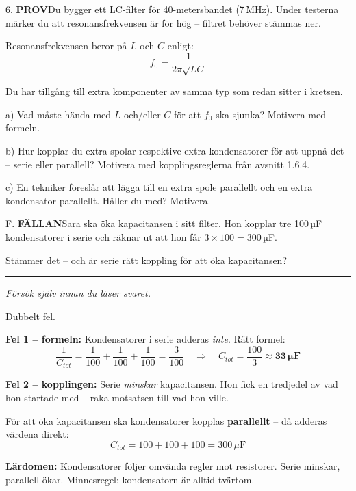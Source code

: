 \documentclass[a4paper,11pt,twoside]{book}
\newcommand{\qprov}{\colorbox{redpale}{\textcolor{reddark}{\headingfont\bfseries\tiny PROV}}}
\newcommand{\qfallan}{\colorbox{ljusbrun}{\textcolor{kakao}{\headingfont\bfseries\tiny FÄLLAN}}}
\begin{document}
\begin{qblock}{6.}
\qprov\quad Du bygger ett LC-filter för 40-metersbandet 
(7\,MHz). Under testerna märker du att resonansfrekvensen 
är för hög -- filtret behöver stämmas ner.

Resonansfrekvensen beror på $L$ och $C$ enligt:
\[ f_0 = \frac{1}{2\pi\sqrt{LC}} \]

Du har tillgång till extra komponenter av samma typ 
som redan sitter i kretsen.

a) Vad måste hända med $L$ och/eller $C$ för att 
$f_0$ ska sjunka? Motivera med formeln.

b) Hur kopplar du extra spolar respektive extra 
kondensatorer för att uppnå det -- serie eller 
parallell? Motivera med kopplingsreglerna från 
avsnitt 1.6.4.

c) En tekniker föreslår att lägga till en extra spole 
parallellt och en extra kondensator parallellt. 
Håller du med? Motivera.
\end{qblock}

\begin{qblock}{F.}
\qfallan\quad Sara ska öka kapacitansen i sitt filter. 
Hon kopplar tre 100\,µF kondensatorer i serie och 
räknar ut att hon får $3 \times 100 = 300$\,µF.

Stämmer det -- och är serie rätt koppling för att 
öka kapacitansen?
\end{qblock}

\medskip
\noindent\rule{\textwidth}{0.4pt}
{\small\itshape Försök själv innan du läser svaret.}
\medskip

\begin{worked}[title={Lösning -- Fallgropsfråga 1.6.4\,F}]
Dubbelt fel. 

\textbf{Fel 1 -- formeln:} Kondensatorer i serie 
adderas \emph{inte}. Rätt formel:
\[ \frac{1}{C_{tot}} = \frac{1}{100} + \frac{1}{100} + \frac{1}{100} = \frac{3}{100} \quad \Rightarrow \quad C_{tot} = \frac{100}{3} \approx \mathbf{33\,\mu\text{F}} \]

\textbf{Fel 2 -- kopplingen:} Serie \emph{minskar} 
kapacitansen. Hon fick en tredjedel av vad hon 
startade med -- raka motsatsen till vad hon ville.

För att öka kapacitansen ska kondensatorer kopplas 
\textbf{parallellt} -- då adderas värdena direkt:
\[ C_{tot} = 100 + 100 + 100 = 300\,\mu\text{F} \]

\textbf{Lärdomen:} Kondensatorer följer omvända 
regler mot resistorer. Serie minskar, parallell ökar. 
Minnesregel: kondensatorn är alltid tvärtom.
\end{worked}
\end{document}
